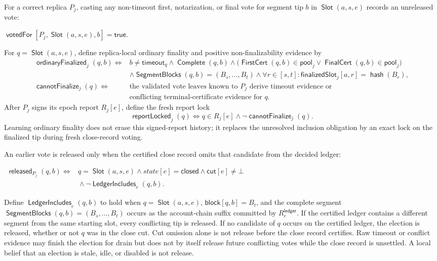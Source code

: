 \documentclass[sigplan,twocolumn,review,anonymous]{acmart}
\newcommand{\func}[1]{\operatorname{\mathsf{#1}}}
\newcommand{\hash}{\func{hash}}
\newcommand{\FirstCert}{\func{FirstCert}}
\newcommand{\FinalCert}{\func{FinalCert}}
\newcommand{\Slot}{\func{Slot}}
\newcommand{\SegmentBlocks}{\func{SegmentBlocks}}
\newcommand{\Complete}{\func{Complete}}
\newcommand{\timeoutVal}{\mathsf{timeout}}
\newcommand{\true}{\mathsf{true}}
\newcommand{\blockMap}{\mathsf{block}}
\newcommand{\finalizedSlot}{\mathsf{finalizedSlot}}
\newcommand{\ordinaryFinalized}{\func{ordinaryFinalized}}
\newcommand{\cannotFinalize}{\func{cannotFinalize}}
\newcommand{\reportLocked}{\func{reportLocked}}
\newcommand{\votedFor}{\func{votedFor}}
\newcommand{\released}{\func{released}}
\newcommand{\closeCut}{\mathsf{cut}}
\begin{document}
For a correct replica \(P_j\), casting any non-timeout first, notarization, or final vote for segment
tip \(b\) in \(\Slot(a,s,e)\) records an unreleased vote:
\begin{center}
\begin{adjustbox}{max width=\columnwidth}
\(\displaystyle
    \votedFor[P_j,\Slot(a,s,e),b]=\true.
\)
\end{adjustbox}
\end{center}
For \(q=\Slot(a,s,e)\), define replica-local ordinary finality and positive non-finalizability evidence by
\[
\begin{aligned}
\ordinaryFinalized_j(q,b)\iff{}&
 b\neq\timeoutVal_q\wedge \Complete(q,b)\wedge
 \bigl(\FirstCert(q,b)\in\mathsf{pool}_j\vee\FinalCert(q,b)\in\mathsf{pool}_j\bigr)\\
&\wedge\SegmentBlocks(q,b)=(B_s,\ldots,B_t)
 \wedge\forall r\in[s,t]:\finalizedSlot_j[a,r]=\hash(B_r),\\
\cannotFinalize_j(q)\iff{}&
 \text{the validated vote leaves known to }P_j\text{ derive timeout evidence or}\\
&\text{conflicting terminal-certificate evidence for }q.
\end{aligned}
\]
After \(P_j\) signs its epoch report \(R_j[e]\), define the fresh report lock
\[
\reportLocked_j(q)\iff q\in R_j[e]\wedge\neg\cannotFinalize_j(q).
\]
Learning ordinary finality does not erase this signed-report history; it replaces the unresolved
inclusion obligation by an exact lock on the finalized tip during fresh close-record voting.

An earlier vote is released only when the certified close record omits that candidate from the decided
ledger:
\begin{center}
\begin{adjustbox}{max width=\columnwidth}
\(\displaystyle
\begin{aligned}
\released_{P_j}(q,b)
\iff{}& q=\Slot(a,s,e)\wedge state[e]=\mathsf{closed}\wedge\closeCut[e]\neq\bot\\
&{}\wedge\neg\func{LedgerIncludes}_e(q,b).
\end{aligned}
\)
\end{adjustbox}
\end{center}
Define \(\func{LedgerIncludes}_e(q,b)\) to hold when \(q=\Slot(a,s,e)\),
\(\blockMap[q,b]=B_t\), and the complete segment \(\SegmentBlocks(q,b)=(B_s,\ldots,B_t)\)
occurs as the account-chain suffix committed by \(R^{\mathsf{ledger}}_e\).  If the certified ledger
contains a different segment from the same starting slot, every conflicting tip is released.  If no
candidate of \(q\) occurs on the certified ledger, the election is released, whether or not \(q\) was
in the close cut.  Cut omission alone is not release before the close record certifies.  Raw timeout or
conflict evidence may finish the election for drain but does not by itself release future conflicting
votes while the close record is unsettled.  A local belief that an election is stale, idle, or disabled
is not release.
\end{document}
